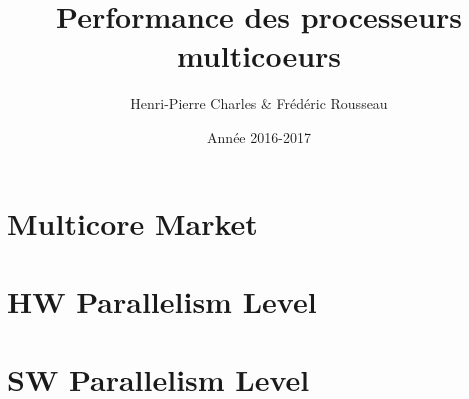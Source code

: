 \documentclass[aspectratio=169]{beamer}
\title{Performance des processeurs multicoeurs}
\subtitle{}
\author{Henri-Pierre Charles \& Frédéric Rousseau}
\date{Année 2016-2017}
\newcommand{\Slide}[1]{}
\begin{document}
\begin{frame}
\titlepage
\end{frame}
\section{Multicore Market}
\Slide{Market/MotivatingExample1}
\Slide{Market/MotivatingExample2}
\Slide{Market/MotivatingExample3}
\Slide{Market/MotivatingCode1}
\Slide{Market/MotivatingCode2}
\Slide{Market/MotivatingCode3}
\begin{frame}
  \begin{multicols}{2}
{\small    \tableofcontents[
]}
  \end{multicols}
\end{frame}
\section{HW Parallelism Level}
\Slide{HWParallelismLevel/MultipleLevel}
\Slide{HWParallelismLevel/ILP}
\Slide{HWParallelismLevel/VLIW}
\Slide{HWParallelismLevel/uArch}
\Slide{HWParallelismLevel/MultiCore}
\Slide{HWParallelismLevel/MultiCPU}
\Slide{HWParallelismLevel/Cluster}
\Slide{HWParallelismLevel/MPSoC}
\Slide{HWParallelismLevel/GPU}

\section{SW Parallelism Level}
\Slide{SWParallelismLevel/Compiler}
\Slide{SWParallelismLevel/Thread}
\Slide{SWParallelismLevel/MPI}
\Slide{SWParallelismLevel/OpenMP}
\Slide{SWParallelismLevel/OpenCL}
\Slide{SWParallelismLevel/CUDA}
\end{document}
